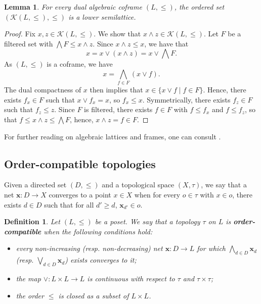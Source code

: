 \documentclass{article}
\newtheorem{lemma}[theorem]{Lemma}
\newtheorem{definition}[theorem]{Definition}
\begin{document}
\begin{lemma}\label{lemma.loc.dominant.semilattice}
    {For every dual algebraic coframe $(L,\le)$,  the ordered set $(\mathcal{K}(L,\le),\le)$ is a lower semilattice.}
\end{lemma}


\begin{proof}
{Fix \(x,z\in\mathcal{K}(L,\le)\). We show that \(x\wedge z\in\mathcal{K}(L,\le)\). Let \(F\) be a filtered set with \(\bigwedge F \le x\wedge z\). Since \(x\wedge z\leq x\), we have that \[x=x\vee (x\wedge z)=x\vee\bigwedge F.\]
As $(L,\le)$ is a coframe, we have 
\[x = \bigwedge_{f\in F}(x\vee f).\]
The dual compactness of \(x\) then implies that \(x \in \{x\vee f\mid f\in F\}\). Hence, there exists \(f_x\in F\) such that \(x\vee f_x=x\), so \(f_x\leq x\). Symmetrically, there exists $f_z \in F$ such that $f_z \le z$. Since \(F\) is filtered, there exists \(f\in F\) with \(f\leq f_x\) and \(f\leq f_z\), so that \(f\leq x\wedge z \le \bigwedge F\), hence, \(x\wedge z=f\in F\).}
\end{proof}


For further reading on algebraic lattices and frames, one can consult \cite{Gierz2003}.


\subsection{\label{section.def.order.compatible}{Order-compatible topologies}}

Given a directed set $(D,\le)$ and a topological space $(X,\tau)$, we say that a net $\boldsymbol{x} : D \rightarrow X$ converges to a point $x \in X$ when for every $o \in \tau$ with $x \in o$, there exists $d \in D$ such that for all $d' \ge d$, $\boldsymbol{x}_{d'} \in o$.

\begin{definition}\label{def.comp.top}
Let $(L,\leq)$ be a poset. We say that a topology $\tau$ on $L$ is \textbf{order-compatible} when the following conditions hold:
\begin{itemize}
\item[(i)] every non-increasing (resp. non-decreasing) net $\boldsymbol{x}:D\to L$ for which $\bigwedge_{d\in D} \boldsymbol{x}_d$ (resp. $\bigvee_{d\in D} \boldsymbol{x}_d$) exists converges to it;
\item[(ii)] the map \(\vee : L \times L \to L\) is continuous with respect to $\tau$ and $\tau \times \tau$;
\item[(iii)] the order $\le$ is closed as a subset of $L \times L$.
\end{itemize}
\end{definition}
\end{document}
